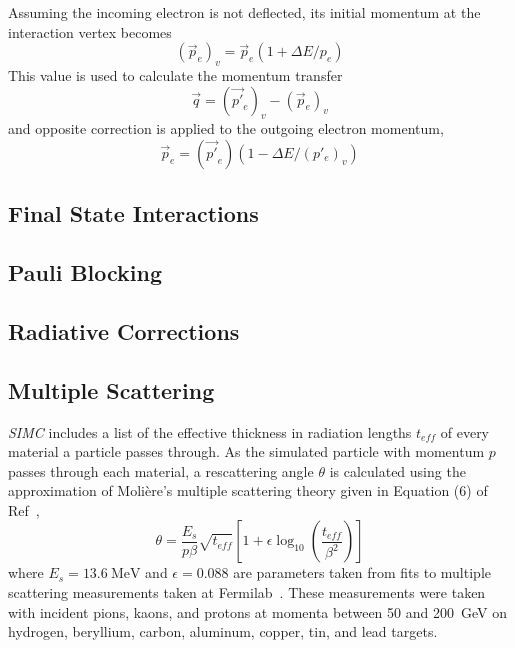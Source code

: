Assuming the incoming electron is not deflected, its initial momentum at the
interaction vertex becomes
\begin{equation}
    (\vec{p}_e)_v = \vec{p}_e(1 + \Delta E / p_e)
\end{equation}
This value is used to calculate the momentum transfer
\begin{equation}
    \vec{q} = (\vec{p'}_e)_v - (\vec{p}_e)_v
\end{equation}
and opposite correction is applied to the outgoing electron momentum,
\begin{equation}
    \vec{p}_e = (\vec{p'}_e)(1 - \Delta E / (p'_e)_v)
\end{equation}

\subsection{Final State Interactions}

\subsection{Pauli Blocking}

\subsection{Radiative Corrections}

\subsection{Multiple Scattering}

\textit{SIMC} includes a list of the effective thickness in radiation lengths
$t_{eff}$ of every material a particle passes through.
As the simulated particle with momentum $p$ passes through each material, a
rescattering angle $\theta$ is calculated using the approximation of
Moli\`{e}re's multiple scattering theory given in Equation (6) of
Ref~\cite{Lynch_1991},
\begin{equation}
    \theta = \frac{E_s}{p \beta}
             \sqrt{t_{eff}}
             \left[1 + \epsilon \log_{10}{\left( \frac{t_{eff}}{\beta^2} \right)}\right]
\end{equation}
where $E_s=\SI{13.6}{\mega\electronvolt}$ and $\epsilon=0.088$ are parameters
taken from fits to multiple scattering measurements taken at
Fermilab~\cite{Shen_1979}.
These measurements were taken with incident pions, kaons, and protons at
momenta between 50 and \SI{200}{\giga\electronvolt} on hydrogen, beryllium,
carbon, aluminum, copper, tin, and lead targets.

